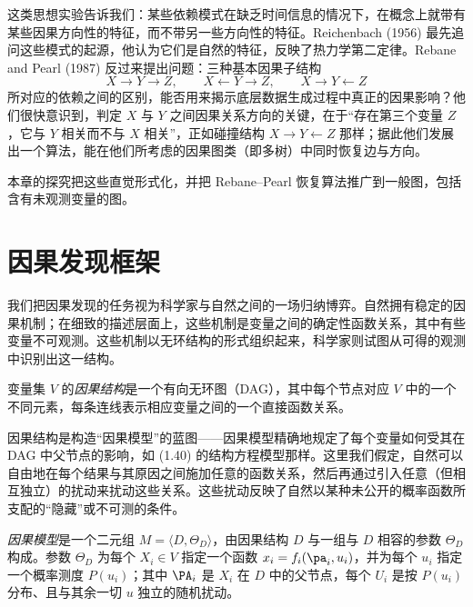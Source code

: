 这类思想实验告诉我们：某些依赖模式在缺乏时间信息的情况下，在概念上就带有某些因果方向性的特征，而不带另一些方向性的特征。Reichenbach (1956) 最先追问这些模式的起源，他认为它们是自然的特征，反映了热力学第二定律。Rebane and Pearl (1987) 反过来提出问题：三种基本因果子结构
\[
X\to Y\to Z,\qquad X\leftarrow Y\to Z,\qquad X\to Y\leftarrow Z
\]
所对应的依赖之间的区别，能否用来揭示底层数据生成过程中真正的因果影响？他们很快意识到，判定 $X$ 与 $Y$ 之间因果关系方向的关键，在于“存在第三个变量 $Z$，它与 $Y$ 相关而不与 $X$ 相关”，正如碰撞结构 $X\to Y\leftarrow Z$ 那样；据此他们发展出一个算法，能在他们所考虑的因果图类（即多树）中同时恢复边与方向。

本章的探究把这些直觉形式化，并把 Rebane–Pearl 恢复算法推广到一般图，包括含有未观测变量的图。

\section{因果发现框架}

我们把因果发现的任务视为科学家与自然之间的一场归纳博弈。自然拥有稳定的因果机制；在细致的描述层面上，这些机制是变量之间的确定性函数关系，其中有些变量不可观测。这些机制以无环结构的形式组织起来，科学家则试图从可得的观测中识别出这一结构。

\begin{definition}[因果结构]
变量集 $V$ 的\emph{因果结构}是一个有向无环图（DAG），其中每个节点对应 $V$ 中的一个不同元素，每条连线表示相应变量之间的一个直接函数关系。
\end{definition}

因果结构是构造“因果模型”的蓝图——因果模型精确地规定了每个变量如何受其在 DAG 中父节点的影响，如 \textup{(1.40)} 的结构方程模型那样。这里我们假定，自然可以自由地在每个结果与其原因之间施加任意的函数关系，然后再通过引入任意（但相互独立）的扰动来扰动这些关系。这些扰动反映了自然以某种未公开的概率函数所支配的“隐藏”或不可测的条件。

\begin{definition}[因果模型]
\emph{因果模型}是一个二元组 $M=\langle D,\Theta_D\rangle$，由因果结构 $D$ 与一组与 $D$ 相容的参数 $\Theta_D$ 构成。参数 $\Theta_D$ 为每个 $X_i\in V$ 指定一个函数 $x_i=f_i(\pa_i,u_i)$，并为每个 $u_i$ 指定一个概率测度 $P(u_i)$；其中 $\PA_i$ 是 $X_i$ 在 $D$ 中的父节点，每个 $U_i$ 是按 $P(u_i)$ 分布、且与其余一切 $u$ 独立的随机扰动。
\end{definition}

